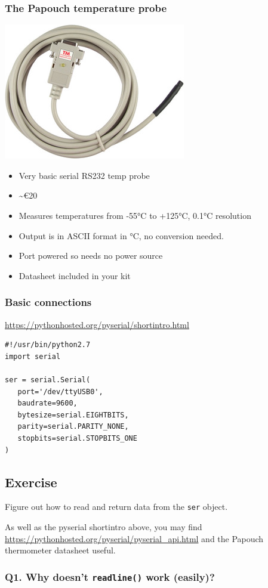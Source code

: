 \documentclass[aspectratio=1610,9pt]{beamer} %
\begin{document}
\begin{frame}
\frametitle{The Papouch temperature probe}

\includegraphics{papouchprobe.jpeg}

\begin{itemize}
\itemsep1pt\parskip0pt
\item
  Very basic serial RS232 temp probe
\item
  \textasciitilde{}\euro{}20
\item
  Measures temperatures from -55°C to +125°C, 0.1°C resolution
\item
  Output is in ASCII format in °C, no conversion needed.
\item
  Port powered so needs no power source
\item
  Datasheet included in your kit
\end{itemize}

\end{frame}
\begin{frame}[fragile]
\frametitle{Basic connections}

\href{https://pythonhosted.org/pyserial/shortintro.html}{https://pythonhosted.org/pyserial/shortintro.html}

\begin{verbatim}
#!/usr/bin/python2.7
import serial

ser = serial.Serial(
   port='/dev/ttyUSB0',
   baudrate=9600,
   bytesize=serial.EIGHTBITS,
   parity=serial.PARITY_NONE,
   stopbits=serial.STOPBITS_ONE
)
\end{verbatim}

\subsection{Exercise}

Figure out how to read and return data from the \texttt{ser} object.

As well as the pyserial shortintro above, you may find
\href{https://pythonhosted.org/pyserial/pyserial_api.html}{https://pythonhosted.org/pyserial/pyserial\_api.html}
and the Papouch thermometer datasheet useful.

\subsubsection{Q1. Why doesn't \texttt{readline()} work (easily)?}

\end{frame}
\end{document}
